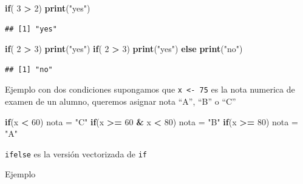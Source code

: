 \documentclass[]{book}
\newenvironment{Shaded}{\begin{snugshade}}{\end{snugshade}}
\newcommand{\KeywordTok}[1]{\textcolor[rgb]{0.13,0.29,0.53}{\textbf{#1}}}
\newcommand{\DecValTok}[1]{\textcolor[rgb]{0.00,0.00,0.81}{#1}}
\newcommand{\StringTok}[1]{\textcolor[rgb]{0.31,0.60,0.02}{#1}}
\newcommand{\ControlFlowTok}[1]{\textcolor[rgb]{0.13,0.29,0.53}{\textbf{#1}}}
\newcommand{\OperatorTok}[1]{\textcolor[rgb]{0.81,0.36,0.00}{\textbf{#1}}}
\newcommand{\NormalTok}[1]{#1}
\begin{document}
\begin{Shaded}
\begin{Highlighting}[]
\ControlFlowTok{if}\NormalTok{( }\DecValTok{3} \OperatorTok{>}\StringTok{ }\DecValTok{2}\NormalTok{) }\KeywordTok{print}\NormalTok{(}\StringTok{"yes"}\NormalTok{)}
\end{Highlighting}
\end{Shaded}

\begin{verbatim}
## [1] "yes"
\end{verbatim}

\begin{Shaded}
\begin{Highlighting}[]
\ControlFlowTok{if}\NormalTok{( }\DecValTok{2} \OperatorTok{>}\StringTok{ }\DecValTok{3}\NormalTok{) }\KeywordTok{print}\NormalTok{(}\StringTok{"yes"}\NormalTok{)}
\ControlFlowTok{if}\NormalTok{( }\DecValTok{2} \OperatorTok{>}\StringTok{ }\DecValTok{3}\NormalTok{) }\KeywordTok{print}\NormalTok{(}\StringTok{"yes"}\NormalTok{) }\ControlFlowTok{else} \KeywordTok{print}\NormalTok{(}\StringTok{"no"}\NormalTok{)}
\end{Highlighting}
\end{Shaded}

\begin{verbatim}
## [1] "no"
\end{verbatim}

Ejemplo con dos condiciones supongamos que \texttt{x\ \textless{}-\ 75}
es la nota numerica de examen de un alumno, queremos asignar nota ``A'',
``B'' o ``C''

\begin{Shaded}
\begin{Highlighting}[]
\ControlFlowTok{if}\NormalTok{(x }\OperatorTok{<}\StringTok{ }\DecValTok{60}\NormalTok{) nota =}\StringTok{ "C"}
\ControlFlowTok{if}\NormalTok{(x }\OperatorTok{>=}\StringTok{ }\DecValTok{60} \OperatorTok{&}\StringTok{ }\NormalTok{x }\OperatorTok{<}\StringTok{ }\DecValTok{80}\NormalTok{) nota =}\StringTok{ "B"}
\ControlFlowTok{if}\NormalTok{(x }\OperatorTok{>=}\StringTok{  }\DecValTok{80}\NormalTok{) nota =}\StringTok{ "A"}
\end{Highlighting}
\end{Shaded}

\texttt{ifelse} es la versión vectorizada de \texttt{if}

Ejemplo
\end{document}
